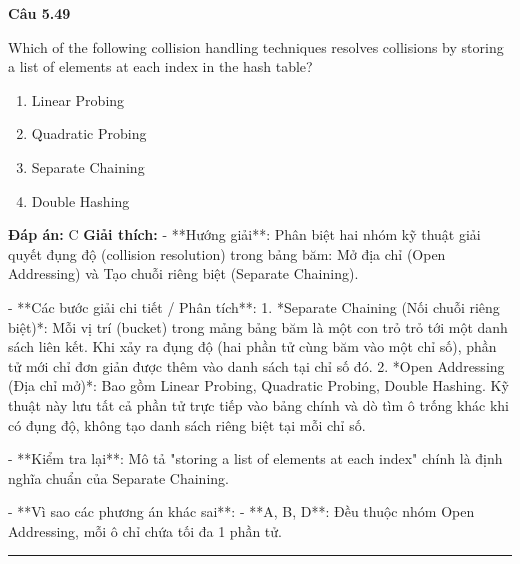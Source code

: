 \documentclass[11pt,a4paper]{article}
\newenvironment{question}[1]{%
  \par\vspace{1em}\noindent\textbf{\large Câu #1}\par\vspace{0.4em}
}{%
  \par\vspace{1em}\hrule\vspace{0.6em}
}
\newenvironment{choices}{%
  \begin{enumerate}[label=\textbf{\Alph*.},leftmargin=2.2em,itemsep=2pt,topsep=3pt]
}{%
  \end{enumerate}
}
\newcommand{\choice}{\item}
\begin{document}
\begin{question}{5.49}
Which of the following collision handling techniques resolves collisions by storing a list of elements at each index in the hash table?
\begin{choices}
\choice Linear Probing
\choice Quadratic Probing
\choice Separate Chaining
\choice Double Hashing
\end{choices}
\textbf{Đáp án:} C
\textbf{Giải thích:} - **Hướng giải**:
  Phân biệt hai nhóm kỹ thuật giải quyết đụng độ (collision resolution) trong bảng băm: Mở địa chỉ (Open Addressing) và Tạo chuỗi riêng biệt (Separate Chaining).

- **Các bước giải chi tiết / Phân tích**:
  1. *Separate Chaining (Nối chuỗi riêng biệt)*: Mỗi vị trí (bucket) trong mảng bảng băm là một con trỏ trỏ tới một danh sách liên kết. Khi xảy ra đụng độ (hai phần tử cùng băm vào một chỉ số), phần tử mới chỉ đơn giản được thêm vào danh sách tại chỉ số đó.
  2. *Open Addressing (Địa chỉ mở)*: Bao gồm Linear Probing, Quadratic Probing, Double Hashing. Kỹ thuật này lưu tất cả phần tử trực tiếp vào bảng chính và dò tìm ô trống khác khi có đụng độ, không tạo danh sách riêng biệt tại mỗi chỉ số.

- **Kiểm tra lại**:
  Mô tả "storing a list of elements at each index" chính là định nghĩa chuẩn của Separate Chaining.

- **Vì sao các phương án khác sai**:
  - **A, B, D**: Đều thuộc nhóm Open Addressing, mỗi ô chỉ chứa tối đa 1 phần tử.
\end{question}
\end{document}
